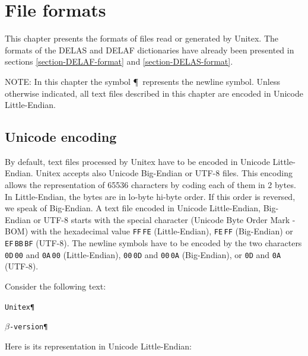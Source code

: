 \chapter{File formats}
\label{chap-file-formats}
This chapter presents the formats of files read or generated by Unitex. The
formats of the DELAS and DELAF dictionaries have already been presented in
sections \ref{section-DELAF-format} and \ref{section-DELAS-format}.

\bigskip
\noindent NOTE: In this chapter the symbol \P ~represents the newline symbol.
Unless otherwise indicated, all text files described in this chapter are encoded
in Unicode Little-Endian.

\section{Unicode encoding}
\label{unicode-encoding}
By default, text files processed by Unitex have to be encoded in Unicode Little-Endian.
Unitex accepts also Unicode Big-Endian or UTF-8 files.
This encoding allows the representation of 65536 characters by coding each of
them in 2 bytes. In Little-Endian, the bytes are in lo-byte hi-byte order. If
this order is reversed, we speak of Big-Endian. A text file encoded in Unicode
Little-Endian, Big-Endian or UTF-8 starts with the special character (Unicode Byte Order Mark - BOM) with the hexadecimal value
\verb+FF+\,\verb+FE+ (Little-Endian), \verb+FE+\,\verb+FF+ (Big-Endian) or \verb+EF+\,\verb+BB+\,\verb+BF+ (UTF-8). The
newline symbols have to be encoded by the two characters \verb+0D+\,\verb+00+ and \verb+0A+\,\verb+00+ (Little-Endian), 
\verb+00+\,\verb+0D+ and \verb+00+\,\verb+0A+ (Big-Endian), or \verb+0D+ and \verb+0A+ (UTF-8).

\bigskip
\noindent Consider the following text:

\bigskip
\texttt{Unitex\P}

\texttt{$\beta$-version\P}

\bigskip
\noindent Here is its representation in Unicode Little-Endian:


